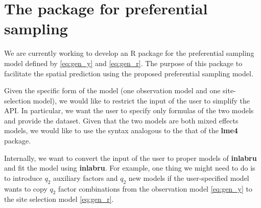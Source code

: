 \documentclass{article}
\begin{document}
\section{The package for preferential sampling}
We are currently working to develop an R package for the preferential sampling model defined 
by \cref{eq:gen_y} and \cref{eq:gen_r}. The purpose of this package to facilitate the spatial
prediction using the proposed preferential sampling model.

Given the specific form of the model (one observation model and one site-selection model), 
we would like to restrict the input of the user to simplify the API. 
In particular, we want the user to specify only formulas of the two models and provide the dataset. 
Given that the two models are both mixed effects models, we would like to use the syntax
analogous to the that of the \textbf{lme4} package.

Internally, we want to convert the input of the user to proper models of \textbf{inlabru} and fit
the model using \textbf{inlabru}. For example, one thing we might need to do is to introduce
$q_2$ auxiliary factors and $q_2$ new models if the user-specified model wants to copy $q_2$
factor combinations from the observation model \cref{eq:gen_y} to the site selection model \cref{eq:gen_r}.

	


\end{document}

